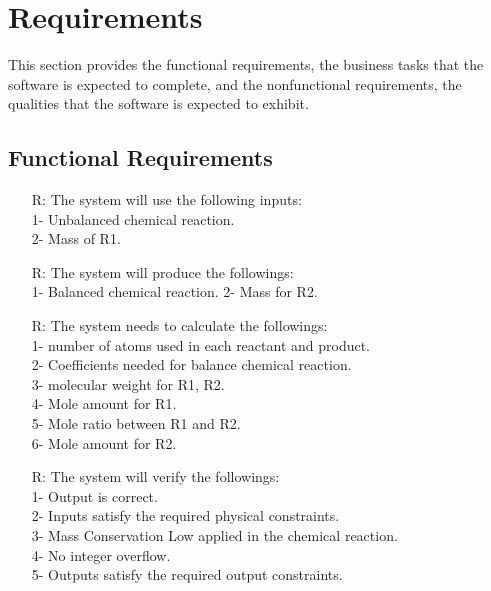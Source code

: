 \documentclass[12pt]{article}
\newcounter{reqnum} %
\begin{document}
\section{Requirements}

This section provides the functional requirements, the business tasks that the
software is expected to complete, and the nonfunctional requirements, the
qualities that the software is expected to exhibit.

\subsection{Functional Requirements}

\noindent \begin{itemize}

\item[R\refstepcounter{reqnum}\thereqnum \label{R_Inputs}:] The system will use the following inputs:\\
1- Unbalanced chemical reaction.\\
2- Mass of R1.\\

\item[R\refstepcounter{reqnum}\thereqnum \label{R_OutputInputs}:]  The system will produce the followings:\\
1- Balanced chemical reaction.
 2- Mass for R2. \\

\item[R\refstepcounter{reqnum}\thereqnum \label{R_Calculate}:] The system needs to calculate the followings:\\
1- number of atoms used in each reactant and product.\\
2- Coefficients needed for balance chemical reaction.\\
3- molecular weight for R1, R2.\\
4- Mole  amount for R1.\\
5- Mole ratio between R1 and R2.\\
6- Mole amount for R2.\\
\item[R\refstepcounter{reqnum}\thereqnum \label{R_VerifyOutput}:] The system will verify the followings:\\
1- Output is correct.\\
2-  Inputs satisfy the required physical constraints.\\
3- Mass Conservation Low applied in the chemical reaction.\\
4- No integer overflow. \\
5- Outputs satisfy the required output constraints.\\
\end{itemize}
\end{document}
